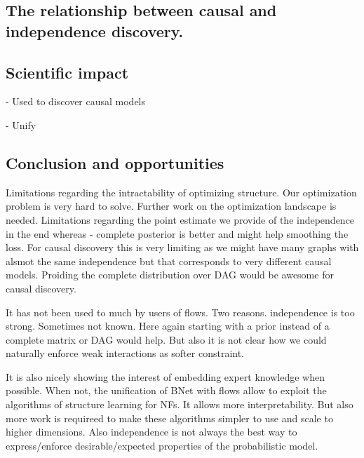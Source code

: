 \subsection{The relationship between causal and independence discovery.}

\subsection{Scientific impact}

- Used to discover causal models

- Unify

\subsection{Conclusion and opportunities}

Limitations regarding the intractability of optimizing structure. Our optimization problem is very hard to solve. Further work on the optimization landscape is needed. Limitations regarding the point estimate we provide of the independence in the end whereas - complete posterior is better and might help smoothing the loss. For causal discovery this is very limiting as we might have many graphs with alsmot the same independence but that corresponds to very different causal models. Proiding the complete distribution over DAG would be awesome for causal discovery.

It has not been used to much by users of flows. Two reasons. independence is too strong. Sometimes not known. Here again starting with a prior instead of a complete matrix or DAG would help. But also it is not clear how we could naturally enforce weak interactions as softer constraint.

It is also nicely showing the interest of embedding expert knowledge when possible. When not, the unification of BNet with flows allow to exploit the algorithms of structure learning for NFs. It allows more interpretability.
But also more work is requireed to make these algorithms simpler to use and scale to higher dimensions. Also independence is not always the best way to express/enforce desirable/expected properties of the probabilistic model.
